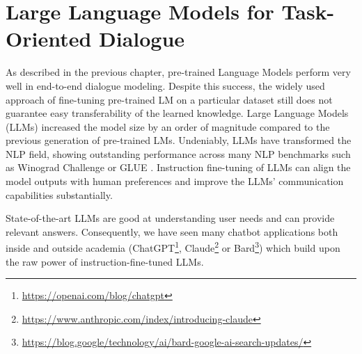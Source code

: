 \chapter{Large Language Models for Task-Oriented Dialogue}
\label{chap:llms}

\label{07:sec:intro}
As described in the previous chapter, pre-trained Language Models perform very well in end-to-end dialogue modeling.
Despite this success, the widely used approach of fine-tuning pre-trained LM on a particular dataset still does not guarantee easy transferability of the learned knowledge.
Large Language Models (LLMs) increased the model size by an order of magnitude compared to the previous generation of pre-trained LMs.
Undeniably, LLMs have transformed the NLP field,
showing outstanding performance across many NLP benchmarks such as Winograd Challenge \cite{levesque2012winograd} or GLUE \cite{wang2018glue}.
Instruction fine-tuning of LLMs can align the model outputs with human preferences \cite{ouyang2022training,supernaturalinstructions} and improve the LLMs' communication capabilities substantially.

State-of-the-art LLMs are good at understanding user needs and can provide relevant answers.
Consequently, we have seen many chatbot applications both inside and outside academia (ChatGPT\footnote{\url{https://openai.com/blog/chatgpt}}, Claude\footnote{\url{https://www.anthropic.com/index/introducing-claude}} or Bard\footnote{\url{https://blog.google/technology/ai/bard-google-ai-search-updates/}}) which build upon the raw power of instruction-fine-tuned LLMs.

